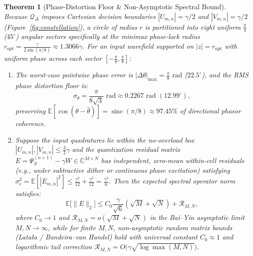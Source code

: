 \documentclass[10pt, twocolumn, a4paper]{article}
\newtheorem{theorem}{Theorem}
\begin{document}
\begin{theorem}[Phase-Distortion Floor \& Non-Asymptotic Spectral Bound]
\label{thm:spectral_bound}
Because $\mathcal{Q}_{\Delta}$ imposes Cartesian decision boundaries $|U_{m,n}| = \gamma/2$ and $|V_{m,n}| = \gamma/2$ (Figure~\ref{fig:constellation}), a circle of radius $r$ is partitioned into eight uniform $\frac{\pi}{4}$ ($45^\circ$) angular sectors specifically at the minimax phase-lock radius $r_{\text{opt}} = \frac{\gamma}{2\sin(\pi/8)} \approx 1.3066\gamma$. For an input wavefield supported on $|z| = r_{\text{opt}}$ with uniform phase across each sector $[-\frac{\pi}{8}, \frac{\pi}{8}]$:
\begin{enumerate}
    \item The worst-case pointwise phase error is $|\Delta\theta|_{\max} = \frac{\pi}{8}\text{ rad}$ ($22.5^\circ$), and the RMS phase distortion floor is:
    \begin{equation}
    \sigma_{\theta} = \frac{\pi}{8\sqrt{3}}\text{ rad} \approx 0.2267\text{ rad } (12.99^\circ),
    \label{eq:rms_phase_floor}
    \end{equation}
    preserving $\mathbb{E}[\cos(\theta - \hat{\theta})] = \operatorname{sinc}(\pi/8) \approx 97.45\%$ of directional phasor coherence.
    \item Suppose the input quadratures lie within the no-overload box $|U_{m,n}|, |V_{m,n}| \le \frac{3}{2}\gamma$ and the quantization residual matrix $E = \Psi_S^{(n+1)} - \gamma W \in \mathbb{C}^{M \times N}$ has independent, zero-mean within-cell residuals (e.g., under subtractive dither or continuous phase excitation) satisfying $\sigma_e^2 = \mathbb{E}[|E_{m,n}|^2] \le \frac{\gamma^2}{12} + \frac{\gamma^2}{12} = \frac{\gamma^2}{6}$. Then the expected spectral operator norm satisfies:
    \begin{equation}
    \mathbb{E}\big[\|E\|_2\big] \le C_0 \frac{\gamma}{\sqrt{6}}\left(\sqrt{M} + \sqrt{N}\right) + \mathcal{R}_{M,N},
    \label{eq:fullband_spectral}
    \end{equation}
    where $C_0 \to 1$ and $\mathcal{R}_{M,N} = o(\sqrt{M}+\sqrt{N})$ in the Bai--Yin asymptotic limit $M, N \to \infty$, while for finite $M, N$, non-asymptotic random matrix bounds (Lata\l{}a / Bandeira--van Handel) hold with universal constant $C_0 \approx 1$ and logarithmic tail correction $\mathcal{R}_{M,N} = O\big(\gamma \sqrt{\log \max(M,N)}\big)$.
\end{enumerate}
\end{theorem}
\end{document}
